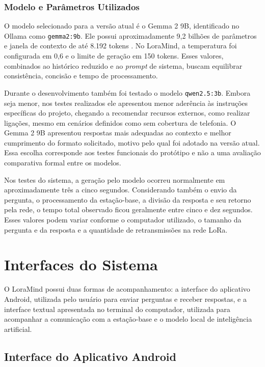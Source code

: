 \documentclass[12pt]{article}
\begin{document}
\subsubsection{Modelo e Parâmetros Utilizados}

O modelo selecionado para a versão atual é o Gemma 2 9B, identificado no Ollama como \texttt{gemma2:9b}. Ele possui aproximadamente 9,2 bilhões de parâmetros e janela de contexto de até 8.192 tokens \cite{gemmateam2024gemma2}. No LoraMind, a temperatura foi configurada em 0,6 e o limite de geração em 150 tokens. Esses valores, combinados ao histórico reduzido e ao \textit{prompt} de sistema, buscam equilibrar consistência, concisão e tempo de processamento.

Durante o desenvolvimento também foi testado o modelo \texttt{qwen2.5:3b}. Embora seja menor, nos testes realizados ele apresentou menor aderência às instruções específicas do projeto, chegando a recomendar recursos externos, como realizar ligações, mesmo em cenários definidos como sem cobertura de telefonia. O Gemma 2 9B apresentou respostas mais adequadas ao contexto e melhor cumprimento do formato solicitado, motivo pelo qual foi adotado na versão atual. Essa escolha corresponde aos testes funcionais do protótipo e não a uma avaliação comparativa formal entre os modelos.

Nos testes do sistema, a geração pelo modelo ocorreu normalmente em aproximadamente três a cinco segundos. Considerando também o envio da pergunta, o processamento da estação-base, a divisão da resposta e seu retorno pela rede, o tempo total observado ficou geralmente entre cinco e dez segundos. Esses valores podem variar conforme o computador utilizado, o tamanho da pergunta e da resposta e a quantidade de retransmissões na rede LoRa.

\section{Interfaces do Sistema}
\label{sec:interfaces-sistema}

O LoraMind possui duas formas de acompanhamento: a interface do aplicativo Android, utilizada pelo usuário para enviar perguntas e receber respostas, e a interface textual apresentada no terminal do computador, utilizada para acompanhar a comunicação com a estação-base e o modelo local de inteligência artificial.

\subsection{Interface do Aplicativo Android}
\end{document}
